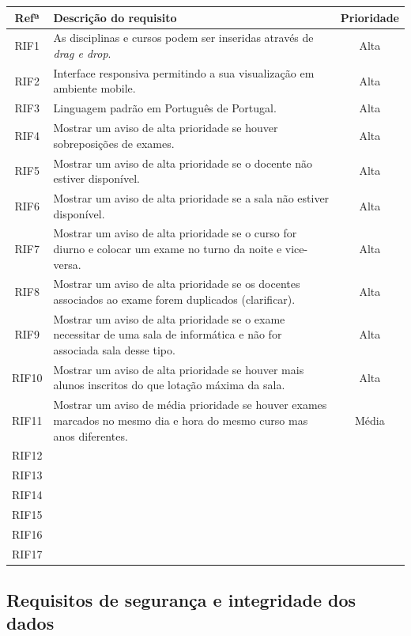 \documentclass[11pt, twoside]{report}
\begin{document}
		\begin{center}
		\begin{tabularx}{\textwidth}{|c|X|c|}
			\hline
			\textbf{Refª }	& \textbf{Descrição do requisito} & \textbf{Prioridade} \\
			\hline
			RIF1 & As disciplinas e cursos podem ser inseridas através de \textit{drag e drop}. & Alta\\
			\hline
			RIF2 & Interface responsiva permitindo a sua visualização em ambiente mobile. & Alta\\
			\hline
			RIF3 & Linguagem padrão em Português de Portugal. & Alta\\
			\hline
			RIF4 & Mostrar um aviso de alta prioridade se houver sobreposições de exames. & Alta\\
			\hline
			RIF5 & Mostrar um aviso de alta prioridade se o docente não estiver disponível. & Alta\\
			\hline
			RIF6 & Mostrar um aviso de alta prioridade se a sala não estiver disponível. & Alta\\
			\hline
			RIF7 & Mostrar um aviso de alta prioridade se o curso for diurno e colocar um exame no turno da noite e vice-versa. & Alta\\
			\hline
			RIF8 & Mostrar um aviso de alta prioridade se os docentes associados ao exame forem duplicados (clarificar). & Alta\\
			\hline
			RIF9 & Mostrar um aviso de alta prioridade se o exame necessitar de uma sala de informática e não for associada sala desse tipo. & Alta\\
			\hline
			RIF10 & Mostrar um aviso de alta prioridade se houver mais alunos inscritos do que  lotação máxima da sala. & Alta\\
			\hline
			RIF11 & Mostrar um aviso de média prioridade se houver exames marcados no mesmo dia e hora do mesmo curso mas anos diferentes. & Média\\
			\hline
			RIF12&&\\
			\hline
			RIF13&&\\
			\hline
			RIF14&&\\
			\hline
			RIF15&&\\
			\hline
			RIF16&&\\
			\hline
			RIF17&&\\
			\hline
		\end{tabularx}
		\label{requisitosdeinterface}
	\end{center}
	\subsection{Requisitos de segurança e integridade dos dados}
	
\end{document}
